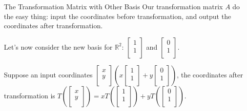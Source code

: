 \documentclass{beamer}
\begin{document}
\begin{frame}{The Transformation Matrix with Other Basis}
Our transformation matrix $A$ do the easy thing: input the coordinates before transformation, and output the coordinates after transformation.

Let's now consider the new basis for $\mathbb{R}^2$: $\left[ \begin{array}{c}
    1\\
    1\\
\end{array} \right]$ and $\left[ \begin{array}{c}
    0\\
    1\\
\end{array} \right]$.

Suppose an input coordinates $\left[ \begin{array}{c}
	x\\
	y\\
\end{array} \right]\left(x\left[ \begin{array}{c}
	1\\
	1\\
\end{array} \right]+y\left[ \begin{array}{c}
	0\\
	1\\
\end{array} \right]\right)$, the coordinates after transformation is $T\left(\left[ \begin{array}{c}
	x\\
	y\\
\end{array}\right]\right)=xT\left(\left[ \begin{array}{c}
	1\\
	1\\
\end{array}\right]\right)+yT\left(\left[ \begin{array}{c}
	0\\
	1\\
\end{array} \right]\right)$.


\end{frame}
\end{document}
